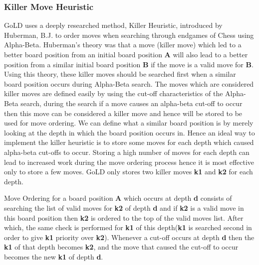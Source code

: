 \documentclass{l4proj}
\newcommand{\bo}[1]{\textbf{#1}}
\begin{document}
\subsubsection{Killer Move Heuristic}
GoLD uses a deeply researched \cite{Akl1977} method, Killer Heuristic, introduced by Huberman, B.J.  \cite{Huberman1968} to order moves when searching through endgames of Chess using Alpha-Beta. Huberman’s theory was that a move (killer move) which led to a better board position from an initial board position \bo{A} will also lead to a better position from a similar initial board position \bo{B} if the move is a valid move for \bo{B}. Using this theory, these killer moves should be searched first when a similar board position occurs during Alpha-Beta search. The moves which are considered killer moves are defined easily by using the cut-off characteristics of the Alpha-Beta search, during the search if a move causes an alpha-beta cut-off to occur then this move can be considered a killer move and hence will be stored to be used for move ordering.  We can define what a similar board position is by merely looking at the depth in which the board position occurs in. Hence an ideal way to implement the killer heuristic is to store some moves for each depth which caused alpha-beta cut-offs to occur. Storing a high number of moves for each depth can lead to increased work during the move ordering process hence it is most effective only to store a few moves. GoLD only stores two killer moves \bo{k1} and \bo{k2}  for each depth.

Move Ordering for a board position \bo{A} which occurs at depth \bo{d} consists of searching the list of valid moves for \bo{k2} of depth \bo{d} and if \bo{k2} is a valid move in this board position then \bo{k2} is ordered to the top of the valid moves list. After which, the same check is performed for \bo{k1} of this depth(\bo{k1} is searched second in order to give \bo{k1} priority over \bo{k2}). Whenever a cut-off occurs at depth \bo{d} then the \bo{k1} of that depth becomes \bo{k2}, and the move that caused the cut-off to occur becomes the new \bo{k1} of depth \bo{d}.
\end{document}
